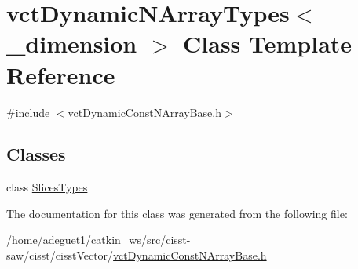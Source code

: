 \hypertarget{classvct_dynamic_n_array_types}{\section{vct\-Dynamic\-N\-Array\-Types$<$ \-\_\-dimension $>$ Class Template Reference}
\label{classvct_dynamic_n_array_types}
}


{\ttfamily \#include $<$vct\-Dynamic\-Const\-N\-Array\-Base.\-h$>$}

\subsection*{Classes}
\begin{DoxyCompactItemize}
\item 
class \hyperlink{classvct_dynamic_n_array_types_1_1_slices_types}{Slices\-Types}
\end{DoxyCompactItemize}


The documentation for this class was generated from the following file\-:\begin{DoxyCompactItemize}
\item 
/home/adeguet1/catkin\-\_\-ws/src/cisst-\/saw/cisst/cisst\-Vector/\hyperlink{vct_dynamic_const_n_array_base_8h}{vct\-Dynamic\-Const\-N\-Array\-Base.\-h}\end{DoxyCompactItemize}
